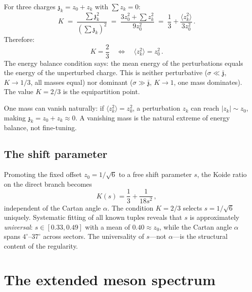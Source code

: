 \documentclass[12pt,a4paper]{article}
\newcommand{\zch}{\mathfrak{z}}
\begin{document}
For three charges $\zch_k = z_0 + z_k$ with $\sum z_k = 0$:
\begin{equation}
  K \;=\; \frac{\sum \zch_k^2}{(\sum \zch_k)^2}
  \;=\; \frac{3z_0^2 + \sum z_k^2}{9z_0^2}
  \;=\; \frac{1}{3} + \frac{\langle z_k^2\rangle}{3z_0^2}\,.
  \label{eq:K_derivation}
\end{equation}
Therefore:
\begin{equation}
  \boxed{K = \frac{2}{3}
  \quad\Longleftrightarrow\quad
  \langle z_k^2\rangle = z_0^2\,.}
  \label{eq:energy_balance}
\end{equation}
The energy balance condition says: the mean energy of the
perturbations equals the energy of the unperturbed charge.
This is neither perturbative ($\sigma \ll \bar{\zch}$,
$K \to 1/3$, all masses equal) nor dominant
($\sigma \gg \bar{\zch}$, $K \to 1$, one mass dominates).
The value $K = 2/3$ is the equipartition point.

One mass can vanish naturally: if
$\langle z_k^2 \rangle = z_0^2$, a perturbation $z_k$ can reach
$|z_k| \sim z_0$, making $\zch_k = z_0 + z_k \approx 0$.
A vanishing mass is the natural extreme of energy balance,
not fine-tuning.

\subsection{The shift parameter}

Promoting the fixed offset $z_0 = 1/\sqrt{6}$ to a free shift
parameter $s$, the Koide ratio on the direct branch becomes
\begin{equation}
  K(s) = \frac{1}{3} + \frac{1}{18 s^2}\,,
  \label{eq:K_of_s}
\end{equation}
independent of the Cartan angle $\alpha$.
The condition $K = 2/3$ selects $s = 1/\sqrt{6}$ uniquely.
Systematic fitting of all known tuples reveals that $s$ is
approximately \emph{universal}:
$s \in [0.33, 0.49]$ with a mean of $0.40 \approx z_0$,
while the Cartan angle $\alpha$ spans $4^\circ$--$37^\circ$
across sectors.
The universality of $s$---not $\alpha$---is the structural
content of the regularity.


\section{The extended meson spectrum}
\label{sec:meson_koide}
\end{document}
